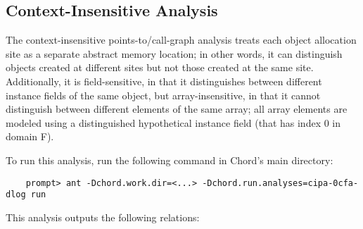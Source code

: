\subsection{Context-Insensitive Analysis}

The context-insensitive points-to/call-graph analysis 
treats each object allocation site as a separate abstract memory location; in other words, it
can distinguish objects created at different sites but not those created at the same site.
Additionally, it is field-sensitive, in that it distinguishes between different instance fields of the same object,
but array-insensitive, in that it cannot distinguish between different elements of the same array;
all array elements are modeled using a distinguished hypothetical instance field (that has index 0 in domain F).

To run this analysis, run the following command in Chord's main directory:

\begin{verbatim}
    prompt> ant -Dchord.work.dir=<...> -Dchord.run.analyses=cipa-0cfa-dlog run
\end{verbatim}

This analysis outputs the following relations:



